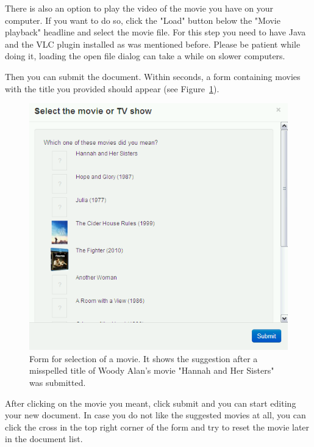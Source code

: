 There is also an option to play the video of the movie you have on your computer. If you want to do so, click the "Load" button below the "Movie playback" headline and select the movie file. For this step you need to have Java and the VLC plugin installed as was mentioned before. Please be patient while doing it, loading the open file dialog can take a while on slower computers. 

Then you can submit the document. Within seconds, a form containing movies with the title you provided should appear (see Figure~\ref{fig:media_sources}).

\begin{figure}[h]
\begin{center}
\includegraphics[scale=0.4]{figures/user_manual/media_sources.png}
\end{center}
\caption{Form for selection of a movie. It shows the suggestion after a misspelled title of Woody Alan's movie "Hannah and Her Sisters" was submitted.}
\label{fig:media_sources}
\end{figure}

After clicking on the movie you meant, click submit and you can start editing your new document. In case you do not like the suggested movies at all, you can click the cross in the top right corner of the form and try to reset the movie later in the document list.


